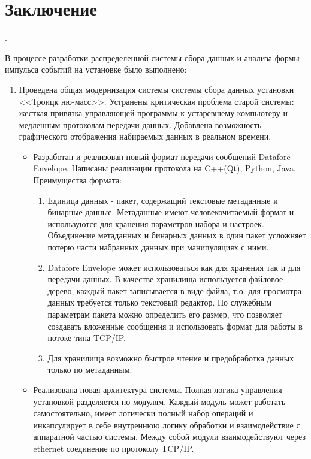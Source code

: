\documentclass[a4paper,14pt]{extreport}
\begin{document}
\chapter*{Заключение}

.

В процессе разработки распределенной системы сбора данных и анализа формы импульса событий на установке  было выполнено:
\begin{enumerate}
    \item Проведена общая модернизация системы системы сбора данных установки <<Троицк ню-масс>>. Устранены критическая  проблема старой системы: жесткая привязка управляющей программы к устаревшему компьютеру и медленным протоколам передачи данных. Добавлена возможность графического отображения набираемых данных в реальном времени. 
    \begin{itemize}
        \item Разработан и реализован новый формат передачи сообщений Datafore Envelope. Написаны реализации протокола на C++(Qt), Python, Java. Преимущества формата:
        \begin{enumerate}
            \item Единица данных - пакет, содержащий текстовые метаданные и бинарные данные. Метаданные имеют человекочитаемый формат и используются для хранения параметров набора и настроек. Объединение метаданных и бинарных данных в один пакет усложняет потерю части набранных данных при манипуляциях с ними.
            \item Datafore Envelope может использоваться как для хранения так и для передачи данных. В качестве хранилища используется файловое дерево, каждый пакет записывается в виде файла, т.о. для просмотра данных требуется только текстовый редактор. По служебным параметрам пакета можно определить его размер, что позволяет создавать вложенные сообщения и использовать формат для работы в потоке типа TCP/IP.
            \item Для хранилища возможно быстрое чтение и предобработка данных только по метаданным.
        \end{enumerate}
        \item Реализована новая архитектура системы. Полная логика управления установкой разделяется по модулям. Каждый модуль может работать самостоятельно, имеет логически полный набор операций и инкапсулирует в себе внутреннюю логику обработки и взаимодействие с аппаратной частью системы. Между собой модули взаимодействуют через ethernet соединение по протоколу TCP/IP.

\end{itemize}
\end{enumerate}
\end{document}
